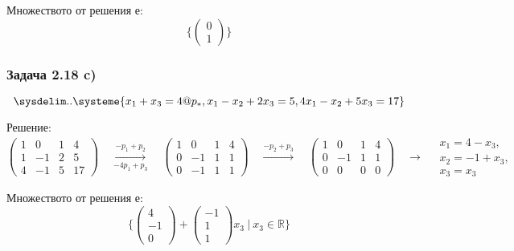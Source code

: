 \documentclass{subfiles}
\begin{document}
\noindent Множеството от решения е:
\begin{equation*}
    \{
        \left(\begin{array}{ c } 0 \\ 1 \end{array}\right)
    \}
\end{equation*}

\subsubsection{Задача 2.18 c)}

\begin{equation*}
    \sysdelim..\systeme{
        x_{1} + x_{3} = 4@p_{*},
        x_{1} - x_{2} + 2x_{3} = 5,
        4x_{1} - x_{2} + 5x_{3} = 17
    }
\end{equation*}

\noindent Решение:
\begin{equation*}
    \left(
        \begin{array}{ ccc|c }
            1 & 0  & 1 & 4 \\
            1 & -1 & 2 & 5 \\
            4 & -1 & 5 & 17
        \end{array}
    \right)
    \quad
    \overset{-p_{1}+p_{2}}{\underset{-4p_{1}+p_{3}}{\longrightarrow}}
    \quad
    \left(
        \begin{array}{ ccc|c }
            1 & 0  & 1 & 4 \\
            0 & -1 & 1 & 1 \\
            0 & -1 & 1 & 1
        \end{array}
    \right)
    \quad
    \overset{-p_{2}+p_{3}}{\longrightarrow}
    \quad
    \left(
        \begin{array}{ ccc|c }
            1 & 0  & 1 & 4 \\
            0 & -1 & 1 & 1 \\
            0 & 0 & 0 & 0
        \end{array}
    \right)
    \quad
    \longrightarrow
    \quad
    \begin{array}{ c }
        x_{1} = 4 - x_{3},\\
        x_{2} = -1 + x_{3}, \\
        x_{3} = x_{3}
    \end{array}
\end{equation*}

\noindent Множеството от решения е:
\begin{equation*}
    \{
        \left(\begin{array}{ c } 4 \\ -1 \\ 0 \end{array}\right) +
        \left(\begin{array}{ c } -1 \\ 1 \\ 1 \end{array}\right) x_{3}
        \ |\ x_{3} \in \mathbb{R}
    \}
\end{equation*}
\end{document}
